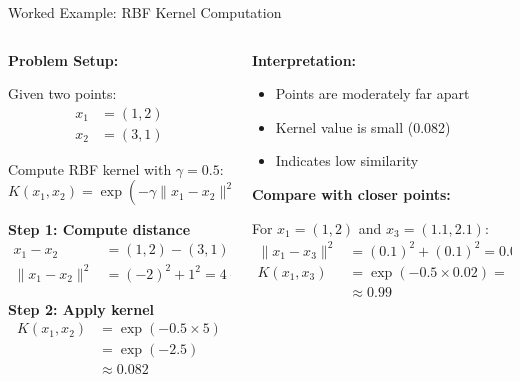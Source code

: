 \documentclass[8pt,aspectratio=1610]{beamer}
\begin{document}
\begin{frame}{Worked Example: RBF Kernel Computation}
\begin{columns}[t]
\begin{column}{0.48\textwidth}
\textbf{Problem Setup:}
\vspace{0.2cm}

Given two points:
\begin{align}
x_1 &= (1, 2) \\
x_2 &= (3, 1)
\end{align}

Compute RBF kernel with $\gamma = 0.5$:
$$K(x_1, x_2) = \exp(-\gamma \|x_1 - x_2\|^2)$$

\vspace{0.3cm}
\textbf{Step 1: Compute distance}
\begin{align}
x_1 - x_2 &= (1, 2) - (3, 1) = (-2, 1) \\
\|x_1 - x_2\|^2 &= (-2)^2 + 1^2 = 4 + 1 = 5
\end{align}

\vspace{0.3cm}
\textbf{Step 2: Apply kernel}
\begin{align}
K(x_1, x_2) &= \exp(-0.5 \times 5) \\
&= \exp(-2.5) \\
&\approx 0.082
\end{align}
\end{column}

\begin{column}{0.48\textwidth}
\textbf{Interpretation:}
\vspace{0.2cm}

\begin{itemize}
\setlength{\itemsep}{1pt}
\item Points are moderately far apart
\item Kernel value is small (0.082)
\item Indicates low similarity
\end{itemize}

\vspace{0.3cm}
\textbf{Compare with closer points:}
\vspace{0.2cm}

For $x_1 = (1, 2)$ and $x_3 = (1.1, 2.1)$:
\begin{align}
\|x_1 - x_3\|^2 &= (0.1)^2 + (0.1)^2 = 0.02 \\
K(x_1, x_3) &= \exp(-0.5 \times 0.02) = \exp(-0.01) \\
&\approx 0.99
\end{align}


\end{column}
\end{columns}
\end{frame}
\end{document}
